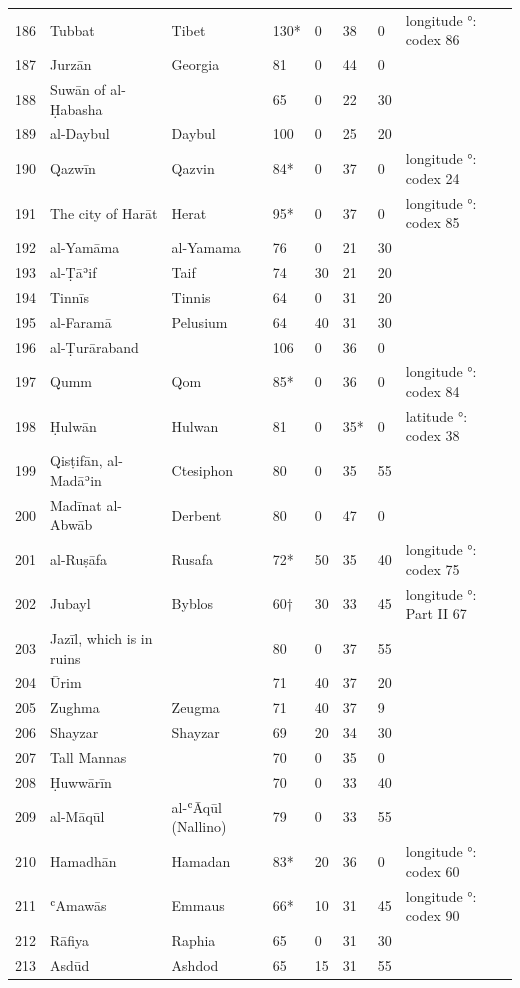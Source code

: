 {\begin{longtable}{R{8mm}L{42mm}L{34mm}R{7mm}R{6mm}R{6mm}R{6mm}L{24mm}}
186 & Tubbat & Tibet & 130* & 0 & 38 & 0 & longitude °: codex 86\\
187 & Jurzān & Georgia & 81 & 0 & 44 & 0 & \\
188 & Suwān of al-Ḥabasha &  & 65 & 0 & 22 & 30 & \\
189 & al-Daybul & Daybul & 100 & 0 & 25 & 20 & \\
190 & Qazwīn & Qazvin & 84* & 0 & 37 & 0 & longitude °: codex 24\\
191 & The city of Harāt & Herat & 95* & 0 & 37 & 0 & longitude °: codex 85\\
192 & al-Yamāma & al-Yamama & 76 & 0 & 21 & 30 & \\
193 & al-Ṭāʾif & Taif & 74 & 30 & 21 & 20 & \\
194 & Tinnīs & Tinnis & 64 & 0 & 31 & 20 & \\
195 & al-Faramā & Pelusium & 64 & 40 & 31 & 30 & \\
196 & al-Ṭurāraband &  & 106 & 0 & 36 & 0 & \\
197 & Qumm & Qom & 85* & 0 & 36 & 0 & longitude °: codex 84\\
198 & Ḥulwān & Hulwan & 81 & 0 & 35* & 0 & latitude °: codex 38\\
199 & Qisṭifān, al-Madāʾin & Ctesiphon & 80 & 0 & 35 & 55 & \\
200 & Madīnat al-Abwāb & Derbent & 80 & 0 & 47 & 0 & \\
201 & al-Ruṣāfa & Rusafa & 72* & 50 & 35 & 40 & longitude °: codex 75\\
202 & Jubayl & Byblos & 60† & 30 & 33 & 45 & longitude °: Part II 67\\
203 & Jazīl, which is in ruins &  & 80 & 0 & 37 & 55 & \\
204 & Ūrim &  & 71 & 40 & 37 & 20 & \\
205 & Zughma & Zeugma & 71 & 40 & 37 & 9 & \\
206 & Shayzar & Shayzar & 69 & 20 & 34 & 30 & \\
207 & Tall Mannas &  & 70 & 0 & 35 & 0 & \\
208 & Ḥuwwārīn &  & 70 & 0 & 33 & 40 & \\
209 & al-Māqūl & al-ʿĀqūl (Nallino) & 79 & 0 & 33 & 55 & \\
210 & Hamadhān & Hamadan & 83* & 20 & 36 & 0 & longitude °: codex 60\\
211 & ʿAmawās & Emmaus & 66* & 10 & 31 & 45 & longitude °: codex 90\\
212 & Rāfiya & Raphia & 65 & 0 & 31 & 30 & \\
213 & Asdūd & Ashdod & 65 & 15 & 31 & 55 & \\

\end{longtable}}
